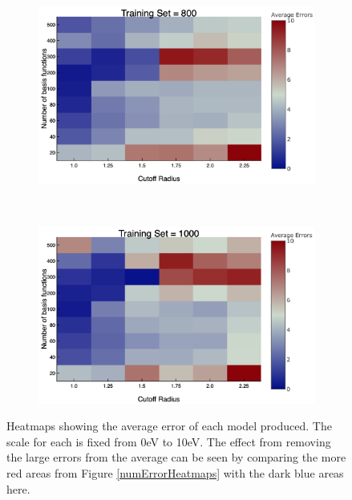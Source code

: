 \begin{figure}
\begin{subfigure}{0.5\textwidth}
    \caption{} 
    \label{aveErrors6}
  \end{subfigure}%
    \hspace*{\fill}   %
  \begin{subfigure}{0.5\textwidth}
    \includegraphics[width=\linewidth]{Figures/aveErrors8}
    \caption{} 
    \label{aveErrors8}
  \end{subfigure}%
    \\
  \begin{subfigure}{0.5\textwidth}
    \includegraphics[width=\linewidth]{Figures/aveErrors10}
    \caption{} 
    \label{aveErrors10}
  \end{subfigure}%
\caption{Heatmaps showing the average error of each model produced. The scale for each is fixed from 0eV to 10eV. The effect from removing the large errors from the average can be seen by comparing the more red areas from Figure \ref{numErrorHeatmaps} with the dark blue areas here.}
\label{aveErrorHeatmaps}
\end{figure}


